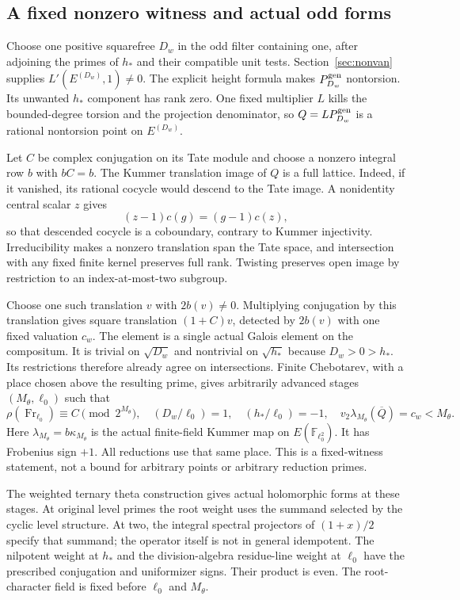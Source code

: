 \documentclass[11pt]{article}
\theoremstyle{definition}
\theoremstyle{remark}
\newcommand{\F}{\mathbb F}
\begin{document}
\subsection{A fixed nonzero witness and actual odd forms}
Choose one positive squarefree $D_w$ in the odd filter containing one,
after adjoining the primes of $h_*$ and their compatible unit tests.
Section~\ref{sec:nonvan} supplies $L'(E^{(D_w)},1)\ne0$.
The explicit height formula makes $P_{D_w}^{\rm gen}$ nontorsion.
Its unwanted $h_*$ component has rank zero. One fixed multiplier $L$
kills the bounded-degree torsion and the projection denominator, so
$Q=LP_{D_w}^{\rm gen}$ is a rational nontorsion point on $E^{(D_w)}$.

Let $C$ be complex conjugation on its Tate module and choose a nonzero
integral row $b$ with $bC=b$. The Kummer translation image of $Q$ is a
full lattice. Indeed, if it vanished, its rational cocycle would descend
to the Tate image. A nonidentity central scalar $z$ gives
\[
 (z-1)c(g)=(g-1)c(z),
\]
so that descended cocycle is a coboundary, contrary to Kummer
injectivity. Irreducibility makes a nonzero translation span the Tate
space, and intersection with any fixed finite kernel preserves full
rank. Twisting preserves open image by restriction to an index-at-most-two
subgroup.

Choose one such translation $v$ with $2b(v)\ne0$.
Multiplying conjugation by this translation gives square translation
$(1+C)v$, detected by $2b(v)$ with one fixed valuation $c_w$.
The element is a single actual Galois element on the compositum.
It is trivial on $\sqrt{D_w}$ and nontrivial on $\sqrt{h_*}$ because
$D_w>0>h_*$. Its restrictions therefore already agree on intersections.
Finite Chebotarev, with a place chosen above the resulting prime, gives
arbitrarily advanced stages $(M_\theta,\ell_0)$ such that
\[
 \rho(\operatorname{Fr}_{\ell_0})\equiv C\pmod {2^{M_\theta}},
 \quad (D_w/\ell_0)=1,\quad(h_*/\ell_0)=-1,
 \quad v_2\lambda_{M_\theta}(\overline Q)=c_w<M_\theta.            \tag{3.7}
\]
Here $\lambda_{M_\theta}=b\kappa_{M_\theta}$ is the actual finite-field
Kummer map on $E(\F_{\ell_0^2})$. It has Frobenius sign $+1$.
All reductions use that same place. This is a fixed-witness statement,
not a bound for arbitrary points or arbitrary reduction primes.

The weighted ternary theta construction gives actual holomorphic
forms at these stages. At original level primes the root weight uses
the summand selected by the cyclic level structure. At two, the
integral spectral projectors of $(1+x)/2$ specify that summand; the
operator itself is not in general idempotent. The nilpotent weight at
$h_*$ and the division-algebra residue-line weight at $\ell_0$ have the
prescribed conjugation and uniformizer signs. Their product is even.
The root-character field is fixed before $\ell_0$ and $M_\theta$.
\end{document}

